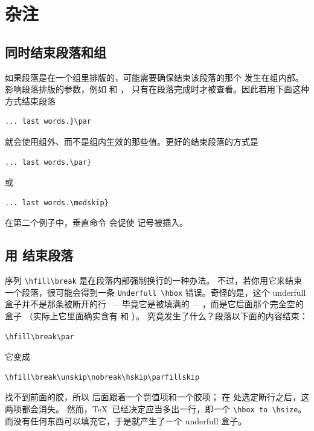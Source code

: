 \documentclass[a4paper]{rapport3}
\def\alt{}\def\altt{}%
\def\ldash{\unskip\ --\nobreak\ \ignorespaces}
\def\rdash{\unskip\nobreak\ --\ \ignorespaces}
\begin{document}
\section{杂注}

\subsection{同时结束段落和组}

如果段落是在一个组里排版的，可能需要确保结束该段落的那个 
发生在组内部。影响段落排版的参数，例如  和 ，
只有在段落完成时才被查看。因此若用下面这种方式结束段落
\begin{verbatim}
... last words.}\par
\end{verbatim}
就会使用组外、而不是组内生效的那些值。更好的结束段落的方式是
\begin{verbatim}
... last words.\par}
\end{verbatim}
或
\begin{verbatim}
... last words.\medskip}
\end{verbatim}
在第二个例子中，垂直命令  会促使  记号被插入。

\subsection{用  结束段落}

序列 \verb.\hfill\break. 是在段落内部强制换行的一种办法。
不过，若你用它来结束一个段落，很可能会得到一条
\verb-Underfull \hbox- 错误。奇怪的是，这个 underfull 盒子并不是那条被断开的行
\ldash 毕竟它是被填满的\rdash，而是它后面那个完全空的盒子
（实际上它里面确实含有  和 ）。
究竟发生了什么？段落以下面的内容结束：
\begin{verbatim}
\hfill\break\par
\end{verbatim}
它变成
\begin{verbatim}
\hfill\break\unskip\nobreak\hskip\parfillskip
\end{verbatim}
 找不到前面的胶，所以  后面跟着一个罚值项和一个胶项；
在  处选定断行之后，这两项都会消失。
然而，\TeX\ 已经决定应当多出一行，即一个 \verb.\hbox to \hsize.。
而\alt 没有任何东西可以填充它，于是就产生了一个 underfull 盒子。
\end{document}
